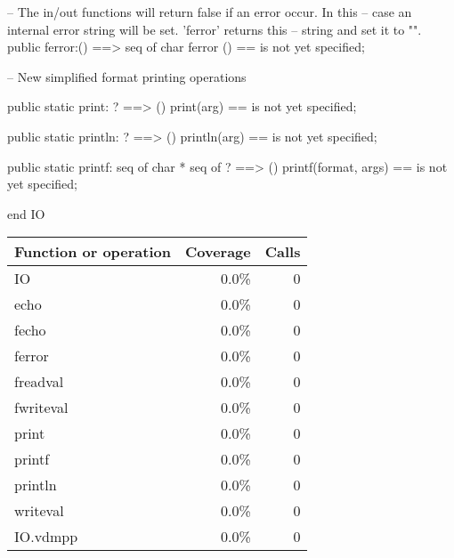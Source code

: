 \documentclass[a4paper]{article}
\begin{document}
\begin{vdm_al}
-- The in/out functions  will return false if an error occur. In this
-- case an internal error string will be set. 'ferror' returns this
-- string and set it to "".
public
ferror:()  ==> seq of char
ferror () ==
  is not yet specified;
  
-- New simplified format printing operations

public static print: ? ==> ()
print(arg) ==
 is not yet specified;

public static println: ? ==> ()
println(arg) ==
 is not yet specified;

public static printf: seq of char * seq of ? ==> ()
printf(format, args) ==
 is not yet specified;

end IO
\end{vdm_al}
\bigskip
\begin{longtable}{|l|r|r|}
\hline
Function or operation & Coverage & Calls \\
\hline
\hline
IO & 0.0\% & 0 \\
\hline
echo & 0.0\% & 0 \\
\hline
fecho & 0.0\% & 0 \\
\hline
ferror & 0.0\% & 0 \\
\hline
freadval & 0.0\% & 0 \\
\hline
fwriteval & 0.0\% & 0 \\
\hline
print & 0.0\% & 0 \\
\hline
printf & 0.0\% & 0 \\
\hline
println & 0.0\% & 0 \\
\hline
writeval & 0.0\% & 0 \\
\hline
\hline
IO.vdmpp & 0.0\% & 0 \\
\hline
\end{longtable}
\end{document}
